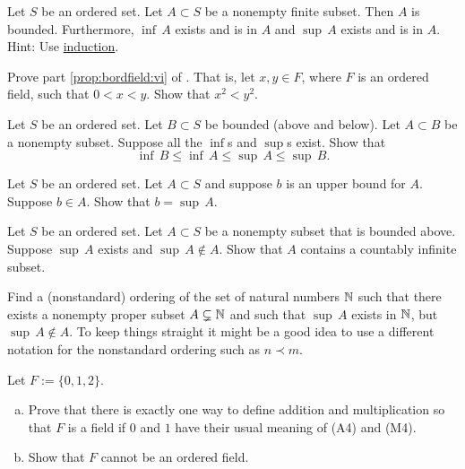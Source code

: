 \begin{exercise} \label{exercise:finitesethasminmax}
Let $S$ be an ordered set.  Let $A \subset S$ be a nonempty finite subset.
Then $A$ is bounded.  Furthermore,
$\inf\, A$ exists and is in $A$ and 
$\sup\, A$ exists and is in $A$.  Hint: Use
\hyperref[induction:thm]{induction}.
\end{exercise}

\begin{exercise} \label{exercise:squareineq}
Prove part \ref{prop:bordfield:vi} of .
That is, let $x, y \in F$, where $F$ is an ordered field, such that
$0 < x < y$.  Show that $x^2 < y^2$.
\end{exercise}

\begin{exercise}
Let $S$ be an ordered set.  Let $B \subset S$ be bounded (above and
below).  Let $A \subset B$ be a nonempty subset.
Suppose all the $\inf$s and
$\sup$s exist. Show that
\begin{equation*}
\inf\, B \leq \inf\, A \leq \sup\, A \leq \sup\, B .
\end{equation*}
\end{exercise}

\begin{exercise}
Let $S$ be an ordered set.  Let $A \subset S$ and suppose 
$b$ is an upper bound for $A$.  Suppose $b \in A$.  Show
that $b = \sup\, A$.
\end{exercise}

\begin{exercise}
Let $S$ be an ordered set.  Let $A \subset S$ be a nonempty subset
that is bounded above.
Suppose $\sup\, A$ exists and
$\sup\, A \notin A$.
Show that $A$ contains a countably infinite
subset.
\end{exercise}

\begin{exercise}
Find a (nonstandard) ordering of the set of natural numbers ${\mathbb{N}}$
such that there exists a nonempty proper subset $A \subsetneq {\mathbb{N}}$
and such that $\sup\, A$ exists in ${\mathbb{N}}$, but $\sup\, A \notin A$.
To keep things straight it might be a good idea to use a different
notation for the nonstandard ordering such as $n \prec m$.
\end{exercise}

\begin{exercise}
Let $F := \{ 0, 1, 2 \}$.
\begin{enumerate}[a)]
\item
Prove that there is
exactly one way to define addition and multiplication so that $F$ is
a field if $0$ and $1$ have their usual meaning of (A4) and (M4).
\item
Show that $F$ cannot be an ordered field.
\end{enumerate}
\end{exercise}

